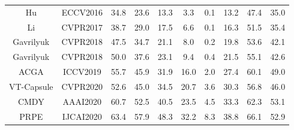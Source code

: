 \documentclass[10pt,twocolumn,letterpaper]{article}
\begin{document}
\begin{table*}[t!]
\begin{tabular}{cccc|cc|ccccc|c|cc|}
	    \multicolumn{4}{|c|}{Hu \etal \cite{hu2016segmentation}}     & \multicolumn{2}{c|}{ECCV2016}                  & \multicolumn{1}{c|}{34.8}  & \multicolumn{1}{c|}{23.6}  & \multicolumn{1}{c|}{13.3} & \multicolumn{1}{c|}{3.3 } & \multicolumn{1}{c|}{0.1} & 13.2 & \multicolumn{1}{c|}{47.4} & 35.0 \\
		\multicolumn{4}{|c|}{Li \etal \cite{li2017tracking}}               & \multicolumn{2}{c|}{CVPR2017}           & \multicolumn{1}{c|}{38.7}  & \multicolumn{1}{c|}{29.0}  & \multicolumn{1}{c|}{17.5} & \multicolumn{1}{c|}{6.6 } & \multicolumn{1}{c|}{0.1} & 16.3 & \multicolumn{1}{c|}{51.5} & 35.4 \\
		\multicolumn{4}{|c|}{Gavrilyuk \etal \cite{gavrilyuk2018actor}}           & \multicolumn{2}{c|}{CVPR2018}       & \multicolumn{1}{c|}{47.5}  & \multicolumn{1}{c|}{34.7}  & \multicolumn{1}{c|}{21.1} & \multicolumn{1}{c|}{8.0 } & \multicolumn{1}{c|}{0.2} & 19.8 & \multicolumn{1}{c|}{53.6} & 42.1 \\
		\multicolumn{4}{|c|}{Gavrilyuk \etal  \cite{gavrilyuk2018actor}}  & \multicolumn{2}{c|}{CVPR2018}      & \multicolumn{1}{c|}{50.0}  & \multicolumn{1}{c|}{37.6}  & \multicolumn{1}{c|}{23.1} & \multicolumn{1}{c|}{9.4 } & \multicolumn{1}{c|}{0.4} & 21.5 & \multicolumn{1}{c|}{55.1} & 42.6 \\
		\multicolumn{4}{|c|}{ACGA \cite{wang2019asymmetric}}                        & \multicolumn{2}{c|}{ICCV2019}      & \multicolumn{1}{c|}{55.7}  & \multicolumn{1}{c|}{45.9}  & \multicolumn{1}{c|}{31.9} & \multicolumn{1}{c|}{16.0} & \multicolumn{1}{c|}{2.0} & 27.4 & \multicolumn{1}{c|}{60.1} & 49.0  \\ 
	    \multicolumn{4}{|c|}{VT-Capsule \cite{mcintosh2020visual}}                  & \multicolumn{2}{c|}{CVPR2020}      & \multicolumn{1}{c|}{52.6}  & \multicolumn{1}{c|}{45.0}  & \multicolumn{1}{c|}{34.5} & \multicolumn{1}{c|}{20.7} & \multicolumn{1}{c|}{3.6} & 30.3 & \multicolumn{1}{c|}{56.8} & 46.0 \\ 
		\multicolumn{4}{|c|}{CMDY \cite{wang2020context}}                        & \multicolumn{2}{c|}{AAAI2020}      & \multicolumn{1}{c|}{60.7}  & \multicolumn{1}{c|}{52.5}  & \multicolumn{1}{c|}{40.5} & \multicolumn{1}{c|}{23.5} & \multicolumn{1}{c|}{4.5} & 33.3 & \multicolumn{1}{c|}{62.3} & 53.1 \\
	
		
	    \multicolumn{4}{|c|}{PRPE \cite{ning2020polar}}                        & \multicolumn{2}{c|}{IJCAI2020}       & \multicolumn{1}{c|}{63.4}      & \multicolumn{1}{c|}{57.9}      & \multicolumn{1}{c|}{48.3}     & \multicolumn{1}{c|}{32.2}     & \multicolumn{1}{c|}{8.3}    & \multicolumn{1}{c|}{38.8} & \multicolumn{1}{c|}{66.1} & \multicolumn{1}{c|}{52.9} \\
			    

\end{tabular}
\end{table*}
\end{document}
